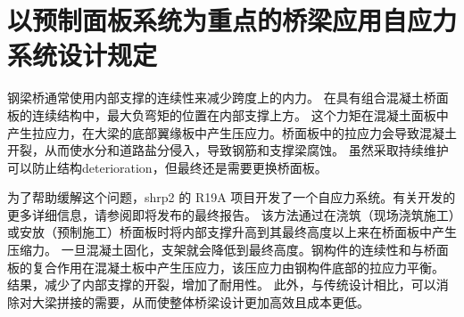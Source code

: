 \chapter{以预制面板系统为重点的桥梁应用自应力系统设计规定}
钢梁桥通常使用内部支撑的连续性来减少跨度上的内力。 在具有组合混凝土桥面板的连续结构中，最大负弯矩的位置在内部支撑上方。 这个力矩在混凝土面板中产生拉应力，在大梁的底部翼缘板中产生压应力。桥面板中的拉应力会导致混凝土开裂，从而使水分和道路盐分侵入，导致钢筋和支撑梁腐蚀。 虽然采取持续维护可以防止结构\gls*{deterioration}，但最终还是需要更换桥面板。

为了帮助缓解这个问题，\gls{shrp}2 的 R19A 项目开发了一个自应力系统。有关开发的更多详细信息，请参阅即将发布的最终报告。 该方法通过在浇筑（现场浇筑施工）或安放（预制施工）桥面板时将内部支撑升高到其最终高度以上来在桥面板中产生压缩力。 一旦混凝土固化，支架就会降低到最终高度。钢构件的连续性和与桥面板的复合作用在混凝土板中产生压应力，该压应力由钢构件底部的拉应力平衡。 结果，减少了内部支撑的开裂，增加了耐用性。 此外，与传统设计相比，可以消除对大梁拼接的需要，从而使整体桥梁设计更加高效且成本更低。



